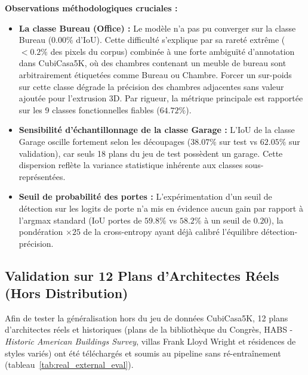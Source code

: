 \documentclass[11pt,a4paper]{report}
\begin{document}
\noindent\textbf{Observations méthodologiques cruciales :}
\begin{itemize}
    \item \textbf{La classe Bureau (Office) :} Le modèle n'a pas pu converger sur la classe Bureau ($0.00\%$ d'IoU). Cette difficulté s'explique par sa rareté extrême ($<0.2\%$ des pixels du corpus) combinée à une forte ambiguïté d'annotation dans CubiCasa5K, où des chambres contenant un meuble de bureau sont arbitrairement étiquetées comme Bureau ou Chambre. Forcer un sur-poids sur cette classe dégrade la précision des chambres adjacentes sans valeur ajoutée pour l'extrusion 3D. Par rigueur, la métrique principale est rapportée sur les 9 classes fonctionnelles fiables ($64.72\%$).
    \item \textbf{Sensibilité d'échantillonnage de la classe Garage :} L'IoU de la classe Garage oscille fortement selon les découpages ($38.07\%$ sur test vs $62.05\%$ sur validation), car seuls 18 plans du jeu de test possèdent un garage. Cette dispersion reflète la variance statistique inhérente aux classes sous-représentées.
    \item \textbf{Seuil de probabilité des portes :} L'expérimentation d'un seuil de détection sur les logits de porte n'a mis en évidence aucun gain par rapport à l'argmax standard (IoU portes de $59.8\%$ vs $58.2\%$ à un seuil de $0.20$), la pondération $\times 25$ de la cross-entropy ayant déjà calibré l'équilibre détection-précision.
\end{itemize}

\subsection{Validation sur 12 Plans d'Architectes Réels (Hors Distribution)}
Afin de tester la généralisation hors du jeu de données CubiCasa5K, 12 plans d'architectes réels et historiques (plans de la bibliothèque du Congrès, HABS - \emph{Historic American Buildings Survey}, villas Frank Lloyd Wright et résidences de styles variés) ont été téléchargés et soumis au pipeline sans ré-entraînement (tableau~\ref{tab:real_external_eval}).
\end{document}
